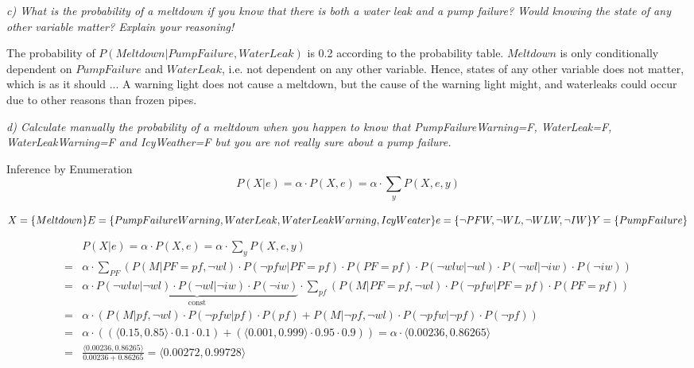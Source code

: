\begin{framed}\em c) What is the probability of a meltdown if you know that there is both a water leak and a pump failure? Would knowing the state of any other variable matter? Explain your reasoning!\em\end{framed}

The probability of $P(Meltdown|PumpFailure, WaterLeak)$ is 0.2 according to the probability table. $Meltdown$ is only conditionally dependent on $PumpFailure$ and $WaterLeak$, i.e. not dependent on any other variable. Hence, states of any other variable does not matter, which is as it should ... A warning light does not cause a meltdown, but the cause of the warning light might, and waterleaks could occur due to other reasons than frozen pipes.

\begin{framed}\em d) Calculate manually the probability of a meltdown when you happen to know that PumpFailureWarning=F, WaterLeak=F, WaterLeakWarning=F and IcyWeather=F but you are not really sure about a pump failure. \em\end{framed}
\newpage

Inference by Enumeration
$$P(X|e) = \alpha\cdot P(X,e) = \alpha\cdot\sum_{y}P(X,e,y)$$

$X = \{Meltdown\}\\E=\{PumpFailureWarning, WaterLeak, WaterLeakWarning, IcyWeater\}\\e=\{\neg PFW, \neg WL, \neg WLW,\neg IW\}\\Y=\{PumpFailure\}$

\begin{align*}
  & P(X|e) = \alpha\cdot P(X,e) = \alpha\cdot\sum_{y}P(X,e,y)\\
  = & \alpha\cdot\sum_{PF}(P(M|PF=pf,\neg wl)\cdot
  P(\neg pfw | PF = pf)\cdot
  P(PF=pf)\cdot
  P(\neg wlw | \neg wl)\cdot
  P(\neg wl | \neg iw)\cdot
  P(\neg iw))\\
  = & \alpha\cdot \underbrace{P(\neg wlw | \neg wl)\cdot P(\neg wl | \neg iw)\cdot P(\neg iw)}_{\mathrm{const}}\cdot
  \sum_{pf}(P(M|PF = pf,\neg wl)\cdot
  P(\neg pfw|PF=pf)\cdot P(PF=pf))\\
  = & \alpha\cdot(P(M|pf,\neg wl)\cdot P(\neg pfw|pf)\cdot P(pf)
  + P(M|\neg pf, \neg wl)\cdot P(\neg pfw| \neg pf)\cdot P(\neg pf))\\
  = & \alpha\cdot((\langle 0.15,0.85\rangle \cdot 0.1\cdot 0.1)+(\langle 0.001, 0.999\rangle \cdot 0.95 \cdot 0.9))
  = \alpha\cdot\langle 0.00236,0.86265 \rangle\\
  = & \frac{\langle 0.00236,0.86265 \rangle}{0.00236+0.86265} = \langle 0.00272,0.99728  \rangle
\end{align*}

